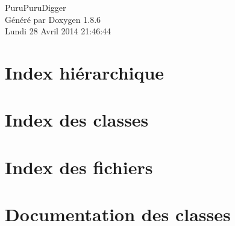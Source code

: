 \documentclass[twoside]{book}
\newcommand{\clearemptydoublepage}{%
  \newpage{\pagestyle{empty}\cleardoublepage}%
}
\begin{document}
\hypersetup{pageanchor=false}
\begin{titlepage}
\vspace*{7cm}
\begin{center}%
{\Large Puru\-Puru\-Digger }\\
\vspace*{1cm}
{\large Généré par Doxygen 1.8.6}\\
\vspace*{0.5cm}
{\small Lundi 28 Avril 2014 21:46:44}\\
\end{center}
\end{titlepage}
\clearemptydoublepage
\tableofcontents
\clearemptydoublepage
{}
\hypersetup{pageanchor=true}

\chapter{Index hiérarchique}

\chapter{Index des classes}

\chapter{Index des fichiers}

\chapter{Documentation des classes}


































\end{document}
